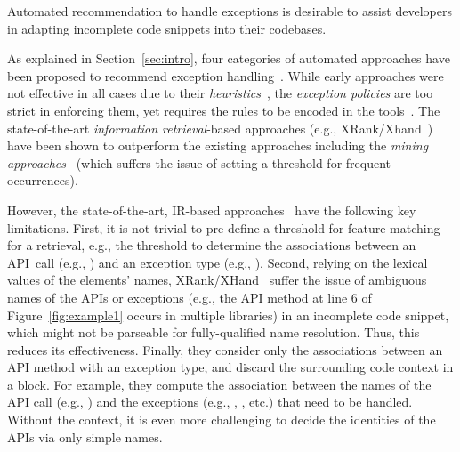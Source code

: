 \begin{Observation} 
\label{ob1}
Automated recommendation to handle exceptions is desirable to
assist developers in adapting incomplete code snippets into their
codebases.
\end{Observation}


As explained in Section~\ref{sec:intro},  four
categories of automated approaches have been proposed to recommend
exception
handling~\cite{xrank-fse20,barbosa-bsse12,chanchal-scam14,barbosa-tse18,barbosa-tse16}. While
early approaches were not effective in all cases due to their {\em
  heuristics}~\cite{barbosa-bsse12}, the {\em exception policies} are
too strict in enforcing them, yet requires the rules to be encoded in
the tools~\cite{barbosa-tse16,barbosa-saner18}. The state-of-the-art
{\em information retrieval}-based approaches (e.g.,
XRank/Xhand~\cite{xrank-fse20}) have been shown to outperform the
existing approaches including the {\em mining
  approaches}~\cite{chanchal-scam14} (which suffers the issue of setting a
threshold for frequent occurrences).


However, the state-of-the-art, IR-based approaches~\cite{xrank-fse20}
have the following key limitations. First, it is not trivial to
pre-define a threshold for feature matching for a retrieval, e.g., the
threshold to determine the associations between an API~call (e.g.,
) and an exception type (e.g.,
). Second, relying on the lexical
values of the elements' names, XRank/XHand~\cite{xrank-fse20} suffer
the issue of ambiguous names of the APIs or exceptions (e.g., the API
method  at line 6 of Figure~\ref{fig:example1} occurs in
multiple libraries) in an incomplete code snippet, which might not be
parseable for fully-qualified name resolution. Thus, this reduces its
effectiveness. Finally,
they consider only the associations between an API method with an
exception type, and discard the surrounding code context in a
 block.  For example, they compute the association
between the names of the API call (e.g., )
and the exceptions (e.g., ,
, etc.)  that need to be handled. Without
the context, it is even more challenging to decide the identities of
the APIs via only simple names.


